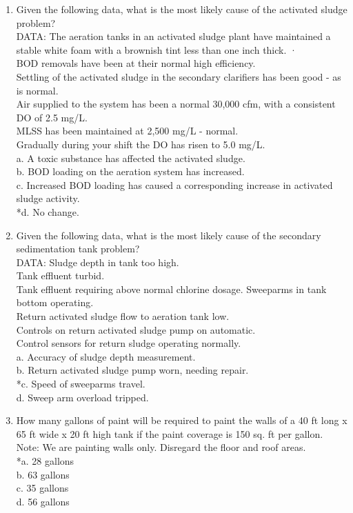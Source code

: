 \begin{enumerate}
\item Given the following data, what is the most likely cause of the activated sludge problem?\\
DATA: The aeration tanks in an activated sludge plant have maintained a stable white foam with a brownish tint less than one inch thick. ·\\
BOD removals have been at their normal high efficiency.\\
Settling of the activated sludge in the secondary clarifiers has been good - as is normal.\\
Air supplied to the system has been a normal 30,000 cfm, with a consistent DO of 2.5 mg/L.\\
MLSS has been maintained at 2,500 mg/L - normal.\\
Gradually during your shift the DO has risen to 5.0 mg/L. \\
a. A toxic substance has affected the activated sludge. \\
b. BOD loading on the aeration system has increased. \\
c. Increased BOD loading has caused a corresponding increase in activated sludge activity. \\
*d. No change. \\

\item Given the following data, what is the most likely cause of the secondary sedimentation tank problem?\\
DATA: Sludge depth in tank too high.\\
Tank effluent turbid.\\
Tank effluent requiring above normal chlorine dosage.  Sweeparms in tank bottom operating.\\
Return activated sludge flow to aeration tank low.\\
Controls on return activated sludge pump on automatic.\\
Control sensors for return sludge operating normally. \\
a. Accuracy of sludge depth measurement. \\
b. Return activated sludge pump worn, needing repair. \\
*c. Speed of sweeparms travel. \\
d. Sweep arm overload tripped. \\

\item How many gallons of paint will be required to paint the walls of a 40 ft long x 65 ft wide x 20 ft high tank if the paint coverage is 150 sq. ft per gallon.  Note:  We are painting walls only.  Disregard the floor and roof areas. \\
*a. 28 gallons \\
b. 63 gallons \\
c. 35 gallons \\
d. 56 gallons \\


\end{enumerate}
